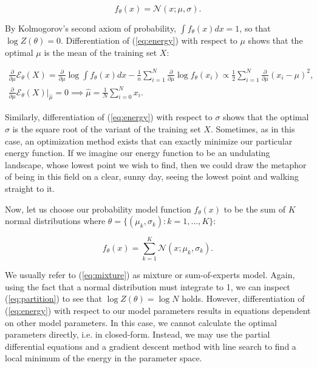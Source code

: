 \documentclass[11pt]{article}
\begin{document}
\begin{equation}
f_\theta(x) = \mathcal{N}(x; \mu, \sigma).
\end{equation}

By Kolmogorov's second axiom of probability, $\int f_\theta(x) dx = 1$, so that $\log Z(\theta) = 0$. Differentiation of (\ref{eq:energy}) with respect to $\mu$ shows that the optimal $\mu$ is the mean of the training set $X$:

\begin{gather*}
\frac{\partial}{\partial\mu} \mathcal{E}_\theta(X) = \frac{\partial}{\partial\mu} \log \int f_\theta(x) dx - \frac{1}{n} \sum_{i=1}^N \frac{\partial}{\partial\mu} \log f_\theta(x_i)
\propto \frac{1}{2} \sum_{i=1}^N \frac{\partial}{\partial\mu} (x_i-\mu)^2,\\
\frac{\partial}{\partial\mu} \mathcal{E}_\theta(X)\big\rvert_{\hat{\mu}} = 0 \implies \hat{\mu} = \frac{1}{N} \sum_{i=0}^N x_i.
\end{gather*}

Similarly, differentiation of (\ref{eq:energy}) with respect to $\sigma$ shows that the optimal $\sigma$ is the square root of the variant of the training set $X$. Sometimes, as in this case, an optimization method exists that can exactly minimize our particular energy function. If we imagine our energy function to be an undulating landscape, whose lowest point we wish to find, then we could draw the metaphor of being in this field on a clear, sunny day, seeing the lowest point and walking straight to it.

Now, let us choose our probability model function $f_\theta(x)$ to be the sum of $K$ normal distributions where $\theta = \{(\mu_k, \sigma_k) : k=1,\ldots,K \}$:

\begin{equation}
f_\theta(x) = \sum_{k=1}^K \mathcal{N}(x; \mu_k, \sigma_k).
\label{eq:mixture}
\end{equation}

We usually refer to (\ref{eq:mixture}) as mixture or sum-of-experts model. Again, using the fact that a normal distribution must integrate to 1, we can inspect (\ref{eq:partition}) to see that $\log Z(\theta) = \log N$ holds. However, differentiation of (\ref{eq:energy}) with respect to our model parameters results in equations dependent on other model parameters. In this case, we cannot calculate the optimal parameters directly, i.e. in closed-form. Instead, we may use the partial differential equations and a gradient descent method with line search to find a local minimum of the energy in the parameter space.
\end{document}
